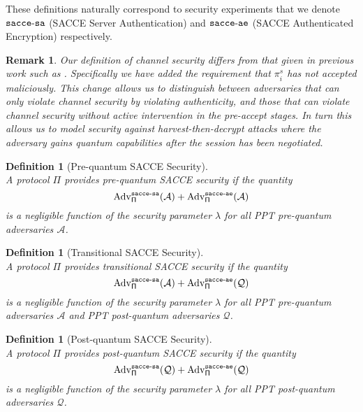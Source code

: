 \documentclass[USenglish,oneside,twocolumn]{article}
\theoremstyle{dgthm}
\theoremstyle{dgdef}
\newtheorem{definition}[theorem]{Definition}
\newtheorem{remark}[theorem]{Remark}
\newcommand{\Protocol}[1]{\operatorname{\mathsf{#1}}}
\newcommand{\p}[2]{\pi_{#1}^{#2}}
\newcommand{\Oracle}[1]{\mathcal #1}
\newcommand{\Experiment}[1]{\operatorname{\tt{#1}}}
\newcommand{\Algorithm}[1]{\mathcal #1}
\newcommand{\AdvName}[2]{\operatorname{\mathrm{Adv}_{\Protocol{#1}}^{\Experiment{#2}}}}
\newcommand{\Adv}[3]{\AdvName{#1}{#2}(\Algorithm{#3})}
\newcommand{\AcceSa}[2]{\Adv{#1}{sacce-sa}{#2}}
\newcommand{\AcceAe}[2]{\Adv{#1}{sacce-ae}{#2}}
\begin{document}
    These definitions naturally correspond to security experiments that we denote
    $\Experiment{sacce-sa}$ (SACCE Server Authentication) and
    $\Experiment{sacce-ae}$ (SACCE Authenticated Encryption) respectively. 

    \begin{remark}
    Our definition of channel security differs from that given in previous work such as
    \cite{Jager2012, Bergsma2014, Krawczyk2013}. Specifically we have added the requirement that $\p i s$ has
    not accepted maliciously. This change allows us to distinguish between adversaries that can \emph{only}
    violate channel security by violating authenticity, and those that can violate channel security
    without active intervention in the pre-accept stages. In turn this allows us to model security against
    harvest-then-decrypt attacks where the adversary gains quantum capabilities after the session has
    been negotiated.
    \end{remark}

    \begin{definition}[Pre-quantum SACCE Security]
      \label{def:prequantum}~\\
      A protocol $\Pi$ provides \emph{pre-quantum SACCE security} if the quantity
      \[\AcceSa{\Pi}{A} + \AcceAe{\Pi}{A}\]
      is a negligible function of the security parameter $\lambda$ for all
      PPT pre-quantum adversaries $\Oracle{A}$.
    \end{definition}

    \begin{definition}[Transitional SACCE Security]
      \label{def:transitional}~\\
      A protocol $\Pi$ provides \emph{transitional SACCE security} if the quantity
      \[\AcceSa{\Pi}{A} + \AcceAe{\Pi}{Q}\]
      is a negligible function of the security parameter $\lambda$ for all
      PPT pre-quantum adversaries $\Oracle{A}$ and PPT post-quantum adversaries $\Oracle{Q}$.
    \end{definition}

    \begin{definition}[Post-quantum SACCE Security]
      \label{def:postquantum}~\\
      A protocol $\Pi$ provides \emph{post-quantum SACCE security} if the quantity
      \[\AcceSa{\Pi}{Q} + \AcceAe{\Pi}{Q}\]
      is a negligible function of the security parameter $\lambda$ for all
      PPT post-quantum adversaries $\Oracle{Q}$.
    \end{definition}
\end{document}
